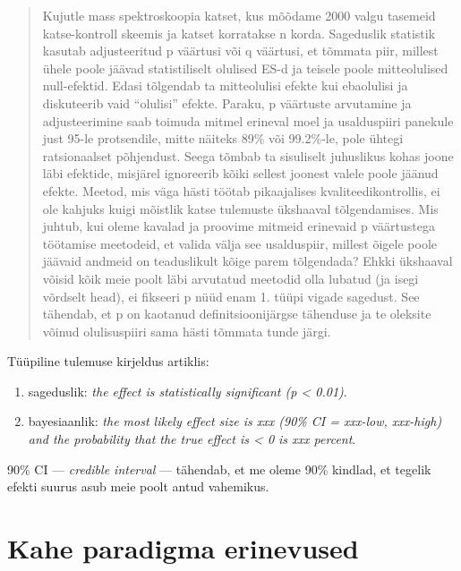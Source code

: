 \documentclass[]{book}
\begin{document}
\begin{quote}
Kujutle mass spektroskoopia katset, kus mõõdame 2000 valgu tasemeid katse-kontroll skeemis ja katset korratakse n korda. Sageduslik statistik kasutab adjusteeritud p väärtusi või q väärtusi, et tõmmata piir, millest ühele poole jäävad statistiliselt olulised ES-d ja teisele poole mitteolulised null-efektid. Edasi tõlgendab ta mitteolulisi efekte kui ebaolulisi ja diskuteerib vaid ``olulisi'' efekte. Paraku, p väärtuste arvutamine ja adjusteerimine saab toimuda mitmel erineval moel ja usalduspiiri panekule just 95-le protsendile, mitte näiteks 89\% või 99.2\%-le, pole ühtegi ratsionaalset põhjendust. Seega tõmbab ta sisuliselt juhuslikus kohas joone läbi efektide, misjärel ignoreerib kõiki sellest joonest valele poole jäänud efekte. Meetod, mis väga hästi töötab pikaajalises kvaliteedikontrollis, ei ole kahjuks kuigi mõistlik katse tulemuste ükshaaval tõlgendamises. Mis juhtub, kui oleme kavalad ja proovime mitmeid erinevaid p väärtustega töötamise meetodeid, et valida välja see usalduspiir, millest õigele poole jäävaid andmeid on teaduslikult kõige parem tõlgendada? Ehkki ükshaaval võisid kõik meie poolt läbi arvutatud meetodid olla lubatud (ja isegi võrdselt head), ei fikseeri p nüüd enam 1. tüüpi vigade sagedust. See tähendab, et p on kaotanud definitsioonijärgse tähenduse ja te oleksite võinud olulisuspiiri sama hästi tõmmata tunde järgi.
\end{quote}

Tüüpiline tulemuse kirjeldus artiklis:

\begin{enumerate}
\def\labelenumi{\arabic{enumi}.}
\item
  sageduslik: \emph{the effect is statistically significant (p \textless{} 0.01)}.
\item
  bayesiaanlik: \emph{the most likely effect size is xxx (90\% CI = xxx-low, xxx-high) and the probability that the true effect is \textless{} 0 is xxx percent}.
\end{enumerate}

90\% CI --- \emph{credible interval} --- tähendab, et me oleme 90\% kindlad, et tegelik efekti suurus asub meie poolt antud vahemikus.

\hypertarget{kahe-paradigma-erinevused}{%
\section*{Kahe paradigma erinevused}\label{kahe-paradigma-erinevused}}
\end{document}
